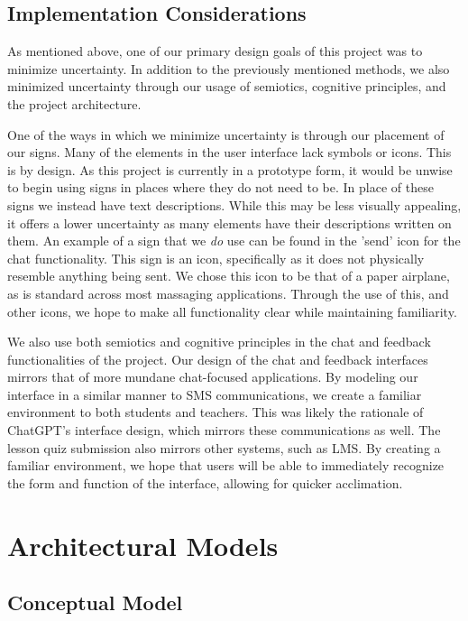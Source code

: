 \documentclass[12pt,a4paper]{article}
\begin{document}
    \subsection{Implementation Considerations}

    As mentioned above, one of our primary design goals of this project was to minimize uncertainty.
    In addition to the previously mentioned methods, we also minimized uncertainty through our
    usage of semiotics, cognitive principles, and the project architecture.

    One of the ways in which we minimize uncertainty is through our placement of our signs.  Many
    of the elements in the user interface lack symbols or icons.  This is by design.  As this project
    is currently in a prototype form, it would be unwise to begin using signs in places where they do
    not need to be.  In place of these signs we instead have text descriptions.  While this may be
    less visually appealing, it offers a lower uncertainty as many elements have their descriptions
    written on them.  An example of a sign that we \textit{do} use can be found in the 'send' icon for the
    chat functionality.  This sign is an icon, specifically as it does not physically resemble anything
    being sent.  We chose this icon to be that of a paper airplane, as is standard across most
    massaging applications.  Through the use of this, and other icons, we hope to make all functionality
    clear while maintaining familiarity.

    We also use both semiotics and cognitive principles in the chat and feedback functionalities of
    the project.  Our design of the chat and feedback interfaces mirrors that of more mundane chat-focused
    applications.  By modeling our interface in a similar manner to SMS communications, we create a
    familiar environment to both students and teachers.  This was likely the rationale of ChatGPT's
    interface design, which mirrors these communications as well.  The lesson quiz submission also
    mirrors other systems, such as LMS.  By creating a familiar environment, we hope that users
    will be able to immediately recognize the form and function of the interface, allowing for
    quicker acclimation.

    \section{Architectural Models}

    \subsection{Conceptual Model}
    
\end{document}
